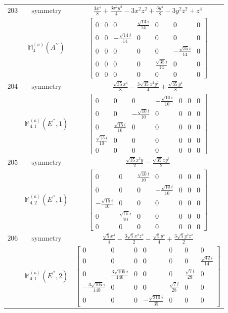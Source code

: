 \documentclass[fleqn,8pt,landscape]{jsarticle}
\begin{document}
\begin{longtable}{ccc}
$ 203 $ & $ \text{symmetry} $ & $ \frac{3 x^{4}}{8} + \frac{3 x^{2} y^{2}}{4} - 3 x^{2} z^{2} + \frac{3 y^{4}}{8} - 3 y^{2} z^{2} + z^{4} $ \\
$  $ & $ \mathbb{M}_{4}^{(a)}(A^{\prime\prime}) $ & $ \begin{bmatrix} 0 & 0 & 0 & \frac{\sqrt{14} i}{14} & 0 & 0 & 0 \\ 0 & 0 & - \frac{\sqrt{14} i}{14} & 0 & 0 & 0 & 0 \\ 0 & 0 & 0 & 0 & 0 & - \frac{\sqrt{35} i}{14} & 0 \\ 0 & 0 & 0 & 0 & \frac{\sqrt{35} i}{14} & 0 & 0 \\ 0 & 0 & 0 & 0 & 0 & 0 & 0 \end{bmatrix} $ \\ \hline
$ 204 $ & $ \text{symmetry} $ & $ \frac{\sqrt{35} x^{4}}{8} - \frac{3 \sqrt{35} x^{2} y^{2}}{4} + \frac{\sqrt{35} y^{4}}{8} $ \\
$  $ & $ \mathbb{M}_{4,1}^{(a)}(E^{\prime\prime},1) $ & $ \begin{bmatrix} 0 & 0 & 0 & - \frac{\sqrt{10} i}{10} & 0 & 0 & 0 \\ 0 & 0 & - \frac{\sqrt{10} i}{10} & 0 & 0 & 0 & 0 \\ 0 & \frac{\sqrt{15} i}{10} & 0 & 0 & 0 & 0 & 0 \\ \frac{\sqrt{15} i}{10} & 0 & 0 & 0 & 0 & 0 & 0 \\ 0 & 0 & 0 & 0 & 0 & 0 & 0 \end{bmatrix} $ \\ \hline
$ 205 $ & $ \text{symmetry} $ & $ \frac{\sqrt{35} x^{3} y}{2} - \frac{\sqrt{35} x y^{3}}{2} $ \\
$  $ & $ \mathbb{M}_{4,2}^{(a)}(E^{\prime\prime},1) $ & $ \begin{bmatrix} 0 & 0 & \frac{\sqrt{10} i}{10} & 0 & 0 & 0 & 0 \\ 0 & 0 & 0 & - \frac{\sqrt{10} i}{10} & 0 & 0 & 0 \\ - \frac{\sqrt{15} i}{10} & 0 & 0 & 0 & 0 & 0 & 0 \\ 0 & \frac{\sqrt{15} i}{10} & 0 & 0 & 0 & 0 & 0 \\ 0 & 0 & 0 & 0 & 0 & 0 & 0 \end{bmatrix} $ \\ \hline
$ 206 $ & $ \text{symmetry} $ & $ \frac{\sqrt{5} x^{4}}{4} - \frac{3 \sqrt{5} x^{2} z^{2}}{2} - \frac{\sqrt{5} y^{4}}{4} + \frac{3 \sqrt{5} y^{2} z^{2}}{2} $ \\
$  $ & $ \mathbb{M}_{4,1}^{(a)}(E^{\prime\prime},2) $ & $ \begin{bmatrix} 0 & 0 & 0 & 0 & 0 & 0 & 0 \\ 0 & 0 & 0 & 0 & 0 & 0 & \frac{\sqrt{42} i}{14} \\ 0 & \frac{3 \sqrt{105} i}{140} & 0 & 0 & 0 & \frac{\sqrt{7} i}{28} & 0 \\ - \frac{3 \sqrt{105} i}{140} & 0 & 0 & 0 & \frac{\sqrt{7} i}{28} & 0 & 0 \\ 0 & 0 & 0 & - \frac{\sqrt{210} i}{35} & 0 & 0 & 0 \end{bmatrix} $ \\ \hline

\end{longtable}
\end{document}
